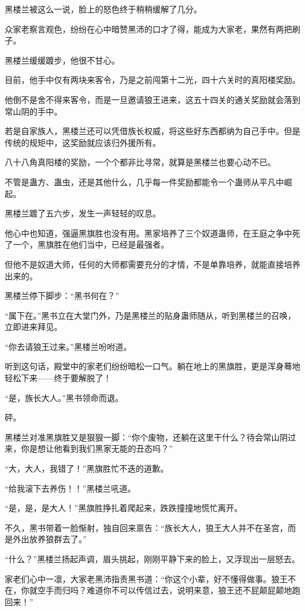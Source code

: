 \begin{this_body}
黑楼兰被这么一说，脸上的怒色终于稍稍缓解了几分。

众家老察言观色，纷纷在心中暗赞黑沛的口才了得，能成为大家老，果然有两把刷子。

黑楼兰缓缓踱步，他很不甘心。

目前，他手中仅有两块来客令，乃是之前闯第十二光，四十六关时的真阳楼奖励。

他倒不是舍不得来客令，而是一旦邀请狼王进来，这五十四关的通关奖励就会落到常山阴的手中。

若是自家族人，黑楼兰还可以凭借族长权威，将这些好东西都纳为自己手中。但是传统的规矩中，这奖励就应该归外援所有。

八十八角真阳楼的奖励，一个个都非比寻常，就算是黑楼兰也要心动不已。

不管是蛊方、蛊虫，还是其他什么，几乎每一件奖励都能令一个蛊师从平凡中崛起。

黑楼兰踱了五六步，发生一声轻轻的叹息。

他心中也知道，强逼黑旗胜也没有用。黑家培养了三个奴道蛊师，在王庭之争中死了一个，黑旗胜在他们当中，已经是最强者。

但他不是奴道大师，任何的大师都需要充分的才情，不是单靠培养，就能直接培养出来的。

黑楼兰停下脚步：“黑书何在？”

“属下在。”黑书立在大堂门外，乃是黑楼兰的贴身蛊师随从，听到黑楼兰的召唤，立即进来拜见。

“你去请狼王过来。”黑楼兰吩咐道。

听到这句话，殿堂中的家老们纷纷暗松一口气。躺在地上的黑旗胜，更是浑身蓦地轻松下来——终于要解脱了！

“是，族长大人。”黑书领命而退。

砰。

黑楼兰对准黑旗胜又是狠狠一脚：“你个废物，还躺在这里干什么？待会常山阴过来，你是想让他看到我们黑家无能的丑态吗？”

“大，大人，我错了！”黑旗胜忙不迭的道歉。

“给我滚下去养伤！！”黑楼兰吼道。

“是，是，是大人！”黑旗胜挣扎着爬起来，跌跌撞撞地慌忙离开。

不久，黑书带着一脸惭射，独自回来禀告：“族长大人，狼王大人并不在圣宫，而是外出放养狼群去了。”

“什么？”黑楼兰扬起声调，眉头挑起，刚刚平静下来的脸上，又浮现出一层怒去。

家老们心中一凛，大家老黑沛指责黑书道：“你这个小辈，好不懂得做事。狼王不在，你就空手而归吗？难道你不可以传信过去，说明来意，狼王还不屁颠屁颠地跑回来！”


\end{this_body}
